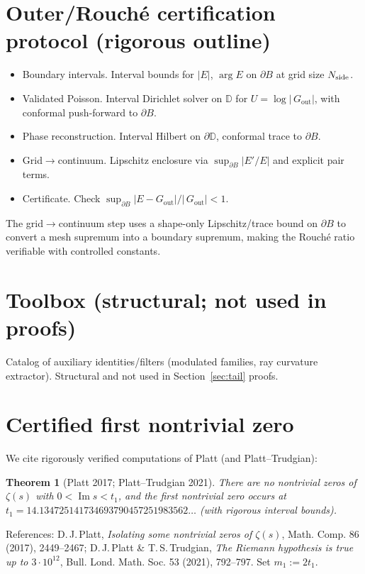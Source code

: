 \documentclass[11pt]{article}
\numberwithin{equation}{section}
\newtheorem{theorem}{Theorem}[section]
\theoremstyle{remark}
\newcommand{\D}{\mathbb{D}}
\DeclareMathOperator{\Imag}{Im}
\newcommand{\Gout}{G_{\mathrm{out}}}
\begin{document}
\section{Outer/Rouch\'e certification protocol (rigorous outline)}\label{app:cert}
\begin{itemize}
\item Boundary intervals. Interval bounds for $|E|$, $\arg E$ on $\partial B$ at grid size $N_{\rm side}$.
\item Validated Poisson. Interval Dirichlet solver on $\D$ for $U=\log|\,\Gout|$, with conformal push-forward to $\partial B$.
\item Phase reconstruction. Interval Hilbert on $\partial\D$, conformal trace to $\partial B$.
\item Grid$\to$continuum. Lipschitz enclosure via $\sup_{\partial B}|E'/E|$ and explicit pair terms.
\item Certificate. Check $\sup_{\partial B}|E-\Gout|/|\,\Gout|<1$.
\end{itemize}
The grid$\to$continuum step uses a shape-only Lipschitz/trace bound on $\partial B$ to convert a mesh supremum into a boundary supremum, making the Rouch\'e ratio verifiable with controlled constants.

\section{Toolbox (structural; not used in proofs)}
Catalog of auxiliary identities/filters (modulated families, ray curvature extractor). Structural and not used in Section~\ref{sec:tail} proofs.

\section{Certified first nontrivial zero}\label{app:firstheight-certified}
We cite rigorously verified computations of Platt (and Platt--Trudgian):
\begin{theorem}[Platt 2017; Platt--Trudgian 2021]
There are no nontrivial zeros of $\zeta(s)$ with $0<\Imag s<t_1$, and the first nontrivial zero occurs at
$t_1=14.134725141734693790457251983562\ldots$ (with rigorous interval bounds).
\end{theorem}
References:
D.\,J.\,Platt, \emph{Isolating some nontrivial zeros of $\zeta(s)$}, Math. Comp. 86 (2017), 2449–2467;
D.\,J.\,Platt \& T.\,S.\,Trudgian, \emph{The Riemann hypothesis is true up to $3\cdot 10^{12}$}, Bull. Lond. Math. Soc. 53 (2021), 792–797.
Set $m_1:=2t_1$.
\end{document}
